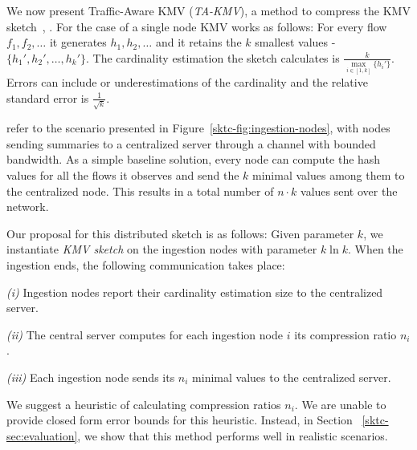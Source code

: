 We now present Traffic-Aware KMV (\emph{TA-KMV}), a method to compress the KMV sketch~\cite{giroire2009order, KMV}, .  For the case of a single node KMV works as follows: For every flow $f_1,f_2,\dots$ it generates  $h_1,h_2,\dots$ and it retains the $k$ smallest values - $\{h_1', h_2', \dots, h_k'\}$. The cardinality estimation the sketch calculates is $\frac{k}{\max\limits_{i \in [1,k]}\{h_i'\}}$. Errors can include  or underestimations of the cardinality and the relative standard error is $\frac{1}{\sqrt{k}}$. 


 refer to the scenario presented in Figure~\ref{sktc-fig:ingestion-nodes}, with nodes sending summaries to a centralized server through a channel with bounded bandwidth.  
As a simple baseline solution, every node can compute the hash values for all the flows it observes and send the $k$ minimal values among them to the centralized node. This results in a total number of $n \cdot k$ values sent over the network. 


Our proposal for this distributed sketch is as follows: Given parameter $k$, we instantiate \emph{KMV sketch} on the ingestion nodes with parameter $k \ln{k}$. When the ingestion ends, the following communication takes place:

\emph{(i)} Ingestion nodes report their cardinality estimation size to the centralized server.

\emph{(ii)} The central server computes for each ingestion node $i$ its compression ratio $n_i$.

\emph{(iii)} Each ingestion node sends its $n_i$ minimal values to the centralized server.

We suggest a heuristic of calculating compression ratios $n_i$. We are unable to provide closed form error bounds for this heuristic. Instead, in Section~ \ref{sktc-sec:evaluation}, we show that this method performs well in realistic scenarios.

